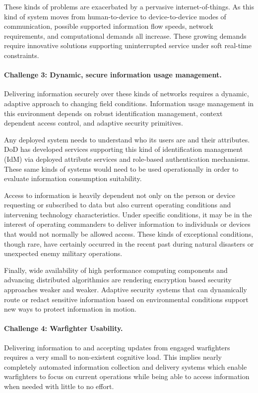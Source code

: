\documentclass{sbir}
\begin{document}
These kinds of problems are exacerbated by a pervasive internet-of-things.  As this kind of system moves from human-to-device to device-to-device modes of communication, possible supported information flow speeds, network requirements, and computational demands all increase.  These growing demands require innovative solutions supporting uninterrupted service under soft real-time constraints.

\paragraph{Challenge 3: Dynamic, secure information usage management.}  Delivering information securely over these kinds of networks requires a dynamic, adaptive approach to changing field conditions.  Information usage management in this environment depends on robust identification management, context dependent access control, and adaptive security primitives.

Any deployed system needs to understand who its users are and their attributes.  DoD has developed services supporting this kind of identification management (IdM) via deployed attribute services and role-based authentication mechanisms.  These same kinds of systems would need to be used operationally in order to evaluate information consumption suitability.

Access to information is heavily dependent not only on the person or device requesting or subscribed to data but also current operating conditions and intervening technology characteristics.  Under specific conditions, it may be in the interest of operating commanders to deliver information to individuals or devices that would not normally be allowed access.  These kinds of exceptional conditions, though rare, have certainly occurred in the recent past during natural disasters or unexpected enemy military operations.

Finally, wide availability of high performance computing components and advancing distributed algorithmics are rendering encryption based security approaches weaker and weaker.  Adaptive security systems that can dynamically route or redact sensitive information based on environmental conditions support new ways to protect information in motion.

\paragraph{Challenge 4: Warfighter Usability.}  Delivering information to and accepting updates from engaged warfighters requires a very small to non-existent cognitive load.  This implies nearly completely automated information collection and delivery systems which enable warfighters to focus on current operations while being able to access information when needed with little to no effort.
\end{document}
